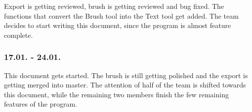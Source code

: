 Export is getting reviewed, brush is getting reviewed and bug fixed. The functions that convert the Brush tool into the Text tool get added. The team decides to start writing this document, since the program is almost feature complete.

\subsubsection{17.01. - 24.01.}

This document gets started. The brush is still getting polished and the export is getting merged into master. The attention of half of the team is shifted towards this document, while the remaining two members finish the few remaining features of the program.
